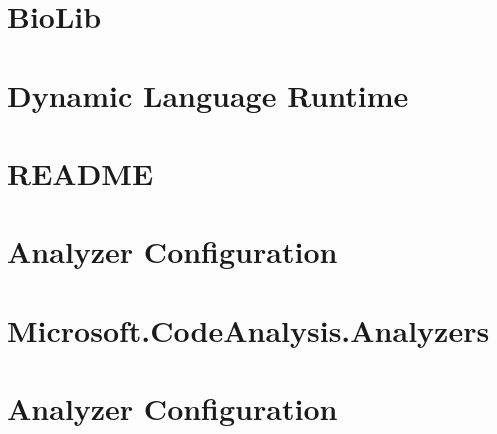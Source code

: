 \documentclass[twoside]{book}
\newcommand{\+}{\discretionary{\mbox{\scriptsize$\hookleftarrow$}}{}{}}
\begin{document}
\chapter{Bio\+Lib}
\label{md_packages__bio_lib_1_5_1__r_e_a_d_m_e}

\chapter{Dynamic Language Runtime}
\label{md_packages__dynamic_language_runtime_1_3_1__r_e_a_d_m_e}

\chapter{README}
\label{md_packages__iron_python_2_7_12__r_e_a_d_m_e}

\chapter{Analyzer Configuration}
\label{md_packages__microsoft__code_analysis__analyzers_3_0_0_documentation__analyzer__configuration}

\chapter{Microsoft.\+Code\+Analysis.\+Analyzers}
\label{md_packages__microsoft__code_analysis__analyzers_3_0_0_documentation__microsoft__code_analysis__analyzers}

\chapter{Analyzer Configuration}
\label{md_packages__microsoft__code_analysis__analyzers_3_3_3_documentation__analyzer__configuration}

\end{document}
